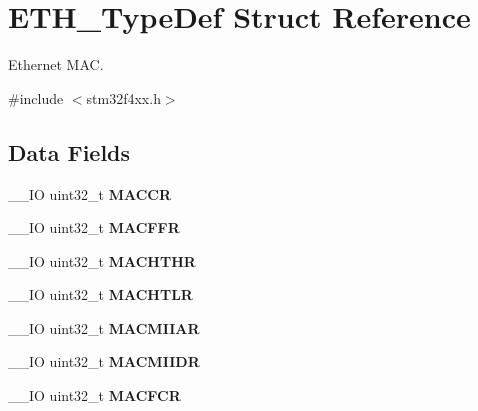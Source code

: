 \hypertarget{struct_e_t_h___type_def}{\section{E\-T\-H\-\_\-\-Type\-Def Struct Reference}
\label{struct_e_t_h___type_def}
}


Ethernet M\-A\-C.  




{\ttfamily \#include $<$stm32f4xx.\-h$>$}

\subsection*{Data Fields}
\begin{DoxyCompactItemize}
\item 
\hypertarget{struct_e_t_h___type_def_a20acbcac1c35f66de94c9ff0e2ddc7b0}{\-\_\-\-\_\-\-I\-O uint32\-\_\-t {\bfseries M\-A\-C\-C\-R}}\label{struct_e_t_h___type_def_a20acbcac1c35f66de94c9ff0e2ddc7b0}

\item 
\hypertarget{struct_e_t_h___type_def_a8ad4e3dbde1518ecde5d979c2a89a76a}{\-\_\-\-\_\-\-I\-O uint32\-\_\-t {\bfseries M\-A\-C\-F\-F\-R}}\label{struct_e_t_h___type_def_a8ad4e3dbde1518ecde5d979c2a89a76a}

\item 
\hypertarget{struct_e_t_h___type_def_a121212bdb227106df681d24e5d896a4e}{\-\_\-\-\_\-\-I\-O uint32\-\_\-t {\bfseries M\-A\-C\-H\-T\-H\-R}}\label{struct_e_t_h___type_def_a121212bdb227106df681d24e5d896a4e}

\item 
\hypertarget{struct_e_t_h___type_def_a1d34ab8e5c2041c00ba9526b3958099d}{\-\_\-\-\_\-\-I\-O uint32\-\_\-t {\bfseries M\-A\-C\-H\-T\-L\-R}}\label{struct_e_t_h___type_def_a1d34ab8e5c2041c00ba9526b3958099d}

\item 
\hypertarget{struct_e_t_h___type_def_a9ea1e1c6615eb3bd70eb328dba65fc87}{\-\_\-\-\_\-\-I\-O uint32\-\_\-t {\bfseries M\-A\-C\-M\-I\-I\-A\-R}}\label{struct_e_t_h___type_def_a9ea1e1c6615eb3bd70eb328dba65fc87}

\item 
\hypertarget{struct_e_t_h___type_def_a87c7687c35332bf5ee86473043652146}{\-\_\-\-\_\-\-I\-O uint32\-\_\-t {\bfseries M\-A\-C\-M\-I\-I\-D\-R}}\label{struct_e_t_h___type_def_a87c7687c35332bf5ee86473043652146}

\item 
\hypertarget{struct_e_t_h___type_def_a12f62d3d3b9ee30c20c324b146e72795}{\-\_\-\-\_\-\-I\-O uint32\-\_\-t {\bfseries M\-A\-C\-F\-C\-R}}\label{struct_e_t_h___type_def_a12f62d3d3b9ee30c20c324b146e72795}


\end{DoxyCompactItemize}
